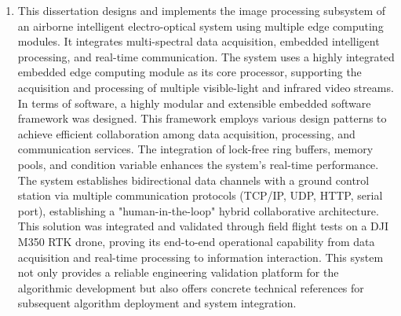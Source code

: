 \begin{englishabstract}
\begin{enumerate}[wide,leftmargin=0pt,itemsep=\baselineskip]
    \item This dissertation designs and implements the image processing subsystem of an airborne intelligent electro-optical system using multiple edge computing modules. It integrates multi-spectral data acquisition, embedded intelligent processing, and real-time communication. The system uses a highly integrated embedded edge computing module as its core processor, supporting the acquisition and processing of multiple visible-light and infrared video streams. In terms of software, a highly modular and extensible embedded software framework was designed. This framework employs various design patterns to achieve efficient collaboration among data acquisition, processing, and communication services. The integration of lock-free ring buffers, memory pools, and condition variable enhances the system's real-time performance. The system establishes bidirectional data channels with a ground control station via multiple communication protocols (TCP/IP, UDP, HTTP, serial port), establishing a "human-in-the-loop" hybrid collaborative architecture. This solution was integrated and validated through field flight tests on a DJI M350 RTK drone, proving its end-to-end operational capability from data acquisition and real-time processing to information interaction. This system not only provides a reliable engineering validation platform for the algorithmic development but also offers concrete technical references for subsequent algorithm deployment and system integration.
\end{enumerate}


\end{englishabstract}